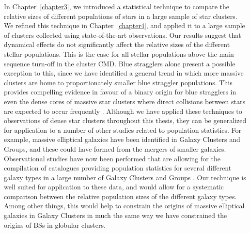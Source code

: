 In Chapter~\ref{chapter3}, we introduced a statistical technique to
compare the relative sizes of different populations of stars in a
large sample of star clusters.  %
We refined this technique in 
Chapter~\ref{chapter4}, and applied it to a large sample of clusters
collected using state-of-the-art observations.  Our results suggest
that dynamical effects do not significantly affect the relative sizes
of the different stellar populations.  This is the case for all
stellar populations above the main-sequence turn-off in the cluster
CMD.  Blue stragglers alone present a possible exception to this,
since we have identified a general trend in which more massive
clusters are home to proportionately smaller blue straggler
populations.  This provides compelling evidence in favour of a binary origin
for blue stragglers in even the dense 
cores of massive star clusters where direct collisions between stars are
expected to occur frequently \citep{knigge09}.  Although we have applied these
techniques to observations of dense star clusters throughout 
this thesis, they can be generalized for application to a number of
other studies related to population statistics.  For example, massive
elliptical galaxies have been identified in Galaxy Clusters and
Groups, and these could have formed from the mergers of smaller
galaxies.  Observational studies have now been 
performed that are allowing for the compilation of catalogues
providing population statistics for several different galaxy types in
a large number of Galaxy Clusters and Groups \citep[e.g.][]{abell58,
  abell89}.  Our technique is
well suited for application to these data, and would allow for a
systematic comparison between the relative population sizes of the
different galaxy types.  Among other things, this
would help to constrain the origins of massive elliptical galaxies in
Galaxy Clusters in
much the same way we have constrained the origins of BSs in globular
clusters.

